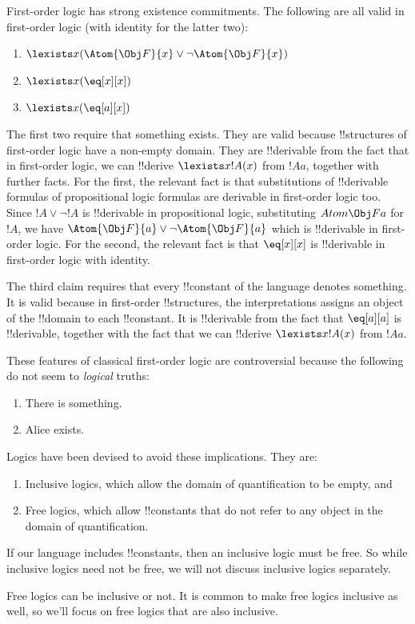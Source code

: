 \documentclass[../../../include/open-logic-section]{subfiles}
\begin{document}


First-order logic has strong existence commitments. The following
are all valid in first-order logic (with identity for the latter two):

\begin{enumerate} 
	\item $\lexists x (\Atom{\Obj F}{x} \lor \lnot \Atom{\Obj F}{x})$ 
	\item $\lexists x (\eq[x][x])$ 
	\item $\lexists x (\eq[a][x])$ 
\end{enumerate}

The first two require that something exists. They are valid because
!!{structure}s of first-order logic have a non-empty domain. They are !!{derivable} from the fact that in first-order logic, we can !!{derive} $\lexists x !A(x)$ from $!A{a}$, together with further facts. For the first, the relevant fact is that substitutions of !!{derivable} formulas of propositional logic formulas are derivable in first-order logic too. Since $!A \lor \lnot !A$ is !!{derivable} in propositional logic, substituting $Atom{\Obj F}{a}$ for $!A$, we have $\Atom{\Obj F}{a} \lor \lnot \Atom{\Obj F}{a}$ which is !!{derivable} in first-order logic. For the second, the relevant fact is that $\eq[x][x]$ is !!{derivable} in first-order logic with identity. 

The third claim requires that every !!{constant} of the language denotes something. It is valid because in first-order !!{structure}s, the interpretations assigns an object of the !!{domain} to each !!{constant}. It is !!{derivable} from the fact that $\eq[a][a]$ is !!{derivable}, together with the fact that we can !!{derive} $\lexists x !A(x)$ from $!A{a}$.

These features of classical first-order logic are controversial because the following do not seem to \emph{logical} truths:

\begin{enumerate}
	\item There is something.
	\item Alice exists. 
\end{enumerate}

Logics have been devised to avoid these implications. They are:

\begin{enumerate}
	\item Inclusive logics, which allow the domain of quantification to be empty, and
	\item Free logics, which allow !!{constant}s that do not refer to any object in the domain of quantification.
\end{enumerate}

If our language includes !!{constant}s, then an inclusive logic must be free. So while inclusive logics need not be free, we will not discuss inclusive logics separately. 

Free logics can be inclusive or not. It is common to make free logics inclusive as well, so we'll focus on free logics that are also inclusive.
\end{document}

